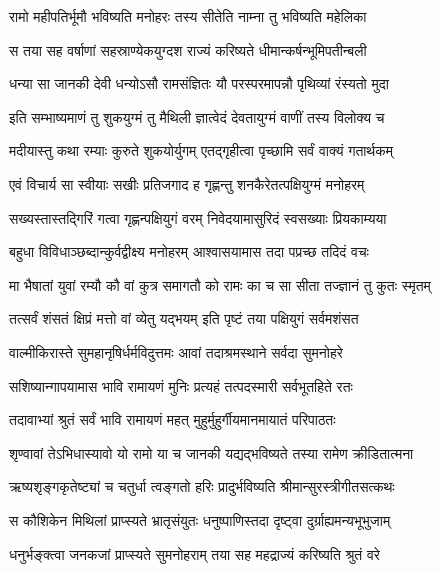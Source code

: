 \twolineshloka
{रामो महीपतिर्भूमौ भविष्यति मनोहरः}
{तस्य सीतेति नाम्ना तु भविष्यति महेलिका}%

\twolineshloka
{स तया सह वर्षाणां सहस्राण्येकयुग्दश}
{राज्यं करिष्यते धीमान्कर्षन्भूमिपतीन्बली}%

\twolineshloka
{धन्या सा जानकी देवी धन्योऽसौ रामसंज्ञितः}
{यौ परस्परमापन्नौ पृथिव्यां रंस्यतो मुदा}%

\twolineshloka
{इति सम्भाष्यमाणं तु शुकयुग्मं तु मैथिली}
{ज्ञात्वेदं देवतायुग्मं वाणीं तस्य विलोक्य च}%

\twolineshloka
{मदीयास्तु कथा रम्याः कुरुते शुकयोर्युगम्}
{एतद्गृहीत्वा पृच्छामि सर्वं वाक्यं गतार्थकम्}%

\twolineshloka
{एवं विचार्य सा स्वीयाः सखीः प्रतिजगाद ह}
{गृह्णन्तु शनकैरेतत्पक्षियुग्मं मनोहरम्}%

\twolineshloka
{सख्यस्तास्तद्गिरिं गत्वा गृह्णन्पक्षियुगं वरम्}
{निवेदयामासुरिदं स्वसख्याः प्रियकाम्यया}%

\twolineshloka
{बहुधा विविधाञ्छब्दान्कुर्वद्वीक्ष्य मनोहरम्}
{आश्वासयामास तदा पप्रच्छ तदिदं वचः}%


\twolineshloka
{मा भैषातां युवां रम्यौ कौ वां कुत्र समागतौ}
{को रामः का च सा सीता तज्ज्ञानं तु कुतः स्मृतम्}%

\twolineshloka
{तत्सर्वं शंसतं क्षिप्रं मत्तो वां व्येतु यद्भयम्}
{इति पृष्टं तया पक्षियुगं सर्वमशंसत}%


\twolineshloka
{वाल्मीकिरास्ते सुमहानृषिर्धर्मविदुत्तमः}
{आवां तदाश्रमस्थाने सर्वदा सुमनोहरे}%

\twolineshloka
{सशिष्यान्गापयामास भावि रामायणं मुनिः}
{प्रत्यहं तत्पदस्मारी सर्वभूतहिते रतः}%

\twolineshloka
{तदावाभ्यां श्रुतं सर्वं भावि रामायणं महत्}
{मुहुर्मुहुर्गीयमानमायातं परिपाठतः}%

\twolineshloka
{शृण्वावां तेऽभिधास्यावो यो रामो या च जानकी}
{यद्यद्भविष्यते तस्या रामेण क्रीडितात्मना}%

\twolineshloka
{ऋष्यशृङ्गकृतेष्ट्यां च चतुर्धा त्वङ्गतो हरिः}
{प्रादुर्भविष्यति श्रीमान्सुरस्त्रीगीतसत्कथः}%

\twolineshloka
{स कौशिकेन मिथिलां प्राप्स्यते भ्रातृसंयुतः}
{धनुष्पाणिस्तदा दृष्ट्वा दुर्ग्राह्यमन्यभूभुजाम्}%

\twolineshloka
{धनुर्भङ्क्त्वा जनकजां प्राप्स्यते सुमनोहराम्}
{तया सह महद्राज्यं करिष्यति श्रुतं वरे}%

